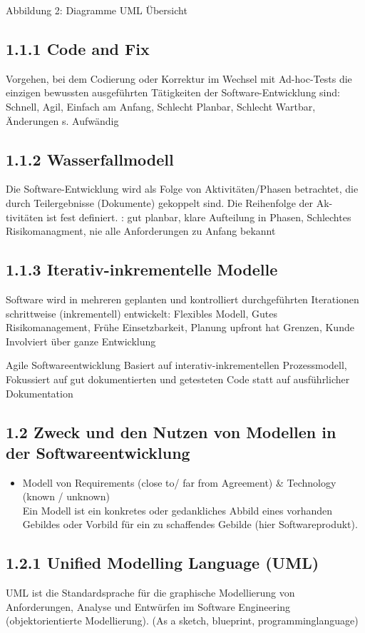 Abbildung 2: Diagramme UML Übersicht

\subsection*{1.1.1 Code and Fix}
Vorgehen, bei dem Codierung oder Korrektur im Wechsel mit Ad-hoc-Tests die einzigen bewussten ausgeführten Tätigkeiten der Software-Entwicklung sind: Schnell, Agil, Einfach am Anfang, Schlecht Planbar, Schlecht Wartbar, Änderungen s. Aufwändig

\subsection*{1.1.2 Wasserfallmodell}
Die Software-Entwicklung wird als Folge von Aktivitäten/Phasen betrachtet, die durch Teilergebnisse (Dokumente) gekoppelt sind. Die Reihenfolge der Ak-\\
tivitäten ist fest definiert. : gut planbar, klare Aufteilung in Phasen, Schlechtes Risikomanagment, nie alle Anforderungen zu Anfang bekannt

\subsection*{1.1.3 Iterativ-inkrementelle Modelle}
Software wird in mehreren geplanten und kontrolliert durchgeführten Iterationen schrittweise (inkrementell) entwickelt: Flexibles Modell, Gutes Risikomanagement, Frühe Einsetzbarkeit, Planung upfront hat Grenzen, Kunde Involviert über ganze Entwicklung

Agile Softwareentwicklung Basiert auf interativ-inkrementellen Prozessmodell, Fokussiert auf gut dokumentierten und getesteten Code statt auf ausführlicher Dokumentation

\subsection*{1.2 Zweck und den Nutzen von Modellen in der Softwareentwicklung}
\begin{itemize}
  \item Modell von Requirements (close to/ far from Agreement) \& Technology (known / unknown)\\
Ein Modell ist ein konkretes oder gedankliches Abbild eines vorhanden Gebildes oder Vorbild für ein zu schaffendes Gebilde (hier Softwareprodukt).
\end{itemize}

\subsection*{1.2.1 Unified Modelling Language (UML)}
UML ist die Standardsprache für die graphische Modellierung von Anforderungen, Analyse und Entwürfen im Software Engineering (objektorientierte Modellierung). (As a sketch, blueprint, programminglanguage)

